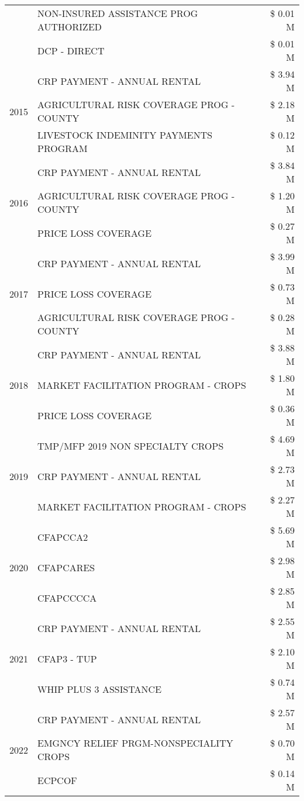 \begin{tabular}{llr}
 & NON-INSURED ASSISTANCE PROG AUTHORIZED & \$ 0.01 M \\
 & DCP - DIRECT & \$ 0.01 M \\
\cline{1-3}
\multirow[t]{3}{*}{2015} & CRP PAYMENT - ANNUAL RENTAL & \$ 3.94 M \\
 & AGRICULTURAL RISK COVERAGE PROG - COUNTY & \$ 2.18 M \\
 & LIVESTOCK INDEMINITY PAYMENTS PROGRAM & \$ 0.12 M \\
\cline{1-3}
\multirow[t]{3}{*}{2016} & CRP PAYMENT - ANNUAL RENTAL & \$ 3.84 M \\
 & AGRICULTURAL RISK COVERAGE PROG - COUNTY & \$ 1.20 M \\
 & PRICE LOSS COVERAGE & \$ 0.27 M \\
\cline{1-3}
\multirow[t]{3}{*}{2017} & CRP PAYMENT - ANNUAL RENTAL & \$ 3.99 M \\
 & PRICE LOSS COVERAGE & \$ 0.73 M \\
 & AGRICULTURAL RISK COVERAGE PROG - COUNTY & \$ 0.28 M \\
\cline{1-3}
\multirow[t]{3}{*}{2018} & CRP PAYMENT - ANNUAL RENTAL & \$ 3.88 M \\
 & MARKET FACILITATION PROGRAM - CROPS & \$ 1.80 M \\
 & PRICE LOSS COVERAGE & \$ 0.36 M \\
\cline{1-3}
\multirow[t]{3}{*}{2019} & TMP/MFP 2019 NON SPECIALTY CROPS & \$ 4.69 M \\
 & CRP PAYMENT - ANNUAL RENTAL & \$ 2.73 M \\
 & MARKET FACILITATION PROGRAM - CROPS & \$ 2.27 M \\
\cline{1-3}
\multirow[t]{3}{*}{2020} & CFAPCCA2 & \$ 5.69 M \\
 & CFAPCARES & \$ 2.98 M \\
 & CFAPCCCCA & \$ 2.85 M \\
\cline{1-3}
\multirow[t]{3}{*}{2021} & CRP PAYMENT - ANNUAL RENTAL & \$ 2.55 M \\
 & CFAP3 - TUP & \$ 2.10 M \\
 & WHIP PLUS 3 ASSISTANCE & \$ 0.74 M \\
\cline{1-3}
\multirow[t]{3}{*}{2022} & CRP PAYMENT - ANNUAL RENTAL & \$ 2.57 M \\
 & EMGNCY RELIEF PRGM-NONSPECIALITY CROPS & \$ 0.70 M \\
 & ECPCOF & \$ 0.14 M \\
\cline{1-3}
\bottomrule
\end{tabular}

